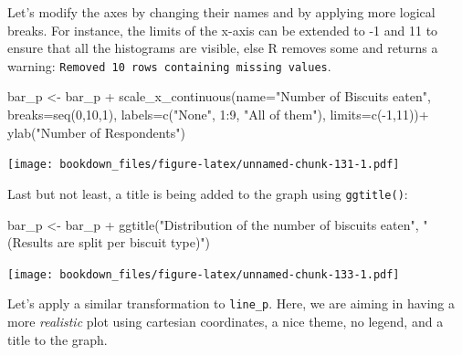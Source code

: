 \documentclass[
]{krantz}
\makeatletter
\newenvironment{Shaded}{\begin{snugshade}}{\end{snugshade}}
\newcommand{\AttributeTok}[1]{\textcolor[rgb]{0.61,0.61,0.61}{#1}}
\newcommand{\DecValTok}[1]{\textcolor[rgb]{0.06,0.06,0.06}{#1}}
\newcommand{\FunctionTok}[1]{\textcolor[rgb]{0,0,0}{#1}}
\newcommand{\NormalTok}[1]{#1}
\newcommand{\OtherTok}[1]{\textcolor[rgb]{0.37,0.37,0.37}{#1}}
\newcommand{\SpecialCharTok}[1]{\textcolor[rgb]{0,0,0}{#1}}
\newcommand{\StringTok}[1]{\textcolor[rgb]{0.5,0.5,0.5}{#1}}
\newenvironment{kframe}{%
\medskip{}
\setlength{\fboxsep}{.8em}
 \def\at@end@of@kframe{}%
 \ifinner\ifhmode%
  \def\at@end@of@kframe{\end{minipage}}%
  \begin{minipage}{\columnwidth}%
 \fi\fi%
 \def\FrameCommand##1{\hskip\@totalleftmargin \hskip-\fboxsep
 \colorbox{shadecolor}{##1}\hskip-\fboxsep
     \hskip-\linewidth \hskip-\@totalleftmargin \hskip\columnwidth}%
 \MakeFramed {\advance\hsize-\width
   \@totalleftmargin\z@ \linewidth\hsize
   \@setminipage}}%
 {\par\unskip\endMakeFramed%
 \at@end@of@kframe}
\renewenvironment{Shaded}{\begin{kframe}}{\end{kframe}}
\makeatother
\begin{document}
Let's modify the axes by changing their names and by applying more logical breaks. For instance, the limits of the x-axis can be extended to -1 and 11 to ensure that all the histograms are visible, else R removes some and returns a warning: \texttt{Removed\ 10\ rows\ containing\ missing\ values}.

\begin{Shaded}
\begin{Highlighting}[]
\NormalTok{bar\_p }\OtherTok{\textless{}{-}}\NormalTok{ bar\_p }\SpecialCharTok{+}
  \FunctionTok{scale\_x\_continuous}\NormalTok{(}\AttributeTok{name=}\StringTok{"Number of Biscuits eaten"}\NormalTok{, }
                     \AttributeTok{breaks=}\FunctionTok{seq}\NormalTok{(}\DecValTok{0}\NormalTok{,}\DecValTok{10}\NormalTok{,}\DecValTok{1}\NormalTok{), }
                     \AttributeTok{labels=}\FunctionTok{c}\NormalTok{(}\StringTok{"None"}\NormalTok{, }\DecValTok{1}\SpecialCharTok{:}\DecValTok{9}\NormalTok{, }\StringTok{"All of them"}\NormalTok{), }
                     \AttributeTok{limits=}\FunctionTok{c}\NormalTok{(}\SpecialCharTok{{-}}\DecValTok{1}\NormalTok{,}\DecValTok{11}\NormalTok{))}\SpecialCharTok{+}
  \FunctionTok{ylab}\NormalTok{(}\StringTok{"Number of Respondents"}\NormalTok{)}
\end{Highlighting}
\end{Shaded}

\texttt{[image: bookdown\_files/figure-latex/unnamed-chunk-131-1.pdf]}

Last but not least, a title is being added to the graph using \texttt{ggtitle()}:

\begin{Shaded}
\begin{Highlighting}[]
\NormalTok{bar\_p }\OtherTok{\textless{}{-}}\NormalTok{ bar\_p }\SpecialCharTok{+}
  \FunctionTok{ggtitle}\NormalTok{(}\StringTok{"Distribution of the number of biscuits eaten"}\NormalTok{,}
          \StringTok{"(Results are split per biscuit type)"}\NormalTok{)}
\end{Highlighting}
\end{Shaded}

\texttt{[image: bookdown\_files/figure-latex/unnamed-chunk-133-1.pdf]}

Let's apply a similar transformation to \texttt{line\_p}. Here, we are aiming in having a more \emph{realistic} plot using cartesian coordinates, a nice theme, no legend, and a title to the graph.
\end{document}
